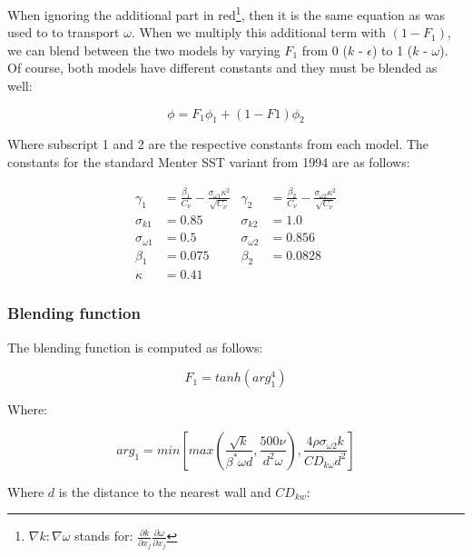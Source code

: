 \noindent When ignoring the additional part in red\footnote{$\nabla k : \nabla
\omega$ stands for: $\frac{\partial k}{\partial x_j} \frac{\partial
\omega}{\partial x_j}$}, then it is the same equation as was used to to
transport $\omega$. When we multiply this additional term with $(1 - F_1)$, we
can blend between the two models by varying $F_1$ from 0 ($k$ - $\epsilon$) to
1 ($k$ - $\omega$). Of course, both models have different constants and they
must be blended as well:

\begin{equation}
    \phi = F_1 \phi_1 + (1 - F1) \phi_2
\end{equation}

\noindent Where subscript 1 and 2 are the respective constants from each model.
The constants for the standard Menter SST variant from 1994  are as follows:
\cite{nasatmr}

\begin{align*}
    \gamma_1 &= \frac{\beta_1}{C_{\nu}} - 
    \frac{\sigma_{\omega 1} \kappa^2}{\sqrt{C_{\nu}}}
    & \gamma_2 &= \frac{\beta_2}{C_{\nu}} - 
    \frac{\sigma_{\omega 2} \kappa^2}{\sqrt{C_{\nu}}}\\
%
    \sigma_{k 1}        &= 0.85  & \sigma_{k 2}         &= 1.0 \\
    \sigma_{\omega 1}   &= 0.5   & \sigma_{\omega 2}    &= 0.856 \\
    \beta_1             &= 0.075 & \beta_2              &= 0.0828 \\
    \kappa              &= 0.41
\end{align*}


\subsubsection{Blending function}
The blending function is computed as follows:

\begin{equation}
    F_1 = tanh(arg_1^4)
\end{equation}

\noindent Where:

\begin{equation}
    arg_1 = min \left[ max \left( 
    \frac{\sqrt{k}}{\beta^{*} \omega d}, \frac{500 \nu}{d^2 \omega}
    \right), 
    \frac{4 \rho \sigma_{\omega 2} k}{CD_{k \omega} d^2}
    \right]
\end{equation}

\noindent Where $d$ is the distance to the nearest wall and $CD_{kw}$:

